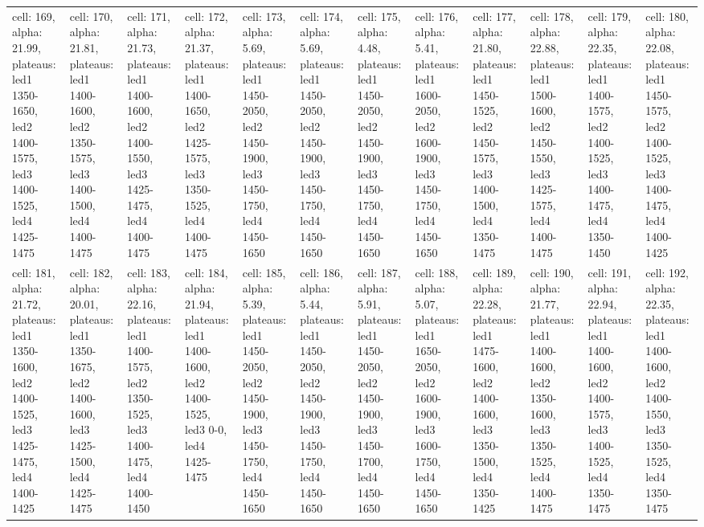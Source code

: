 \documentclass{article}
\begin{document}
\begin{landscape}
\begin{longtable}{|p{1.5cm}|p{1.5cm}|p{1.5cm}|p{1.5cm}|p{1.5cm}|p{1.5cm}|p{1.5cm}|p{1.5cm}|p{1.5cm}|p{1.5cm}|p{1.5cm}|p{1.5cm}|}
\rowcolor{lightgray} cell: 169, alpha: 21.99, plateaus: led1 1350-1650, led2 1400-1575, led3 1400-1525, led4 1425-1475 &cell: 170, alpha: 21.81, plateaus: led1 1400-1600, led2 1350-1575, led3 1400-1500, led4 1400-1475 &cell: 171, alpha: 21.73, plateaus: led1 1400-1600, led2 1400-1550, led3 1425-1475, led4 1400-1475 &cell: 172, alpha: 21.37, plateaus: led1 1400-1650, led2 1425-1575, led3 1350-1525, led4 1400-1475 &cell: 173, alpha: 5.69, plateaus: led1 1450-2050, led2 1450-1900, led3 1450-1750, led4 1450-1650 &cell: 174, alpha: 5.69, plateaus: led1 1450-2050, led2 1450-1900, led3 1450-1750, led4 1450-1650 &cell: 175, alpha: 4.48, plateaus: led1 1450-2050, led2 1450-1900, led3 1450-1750, led4 1450-1650 &cell: 176, alpha: 5.41, plateaus: led1 1600-2050, led2 1600-1900, led3 1450-1750, led4 1450-1650 &cell: 177, alpha: 21.80, plateaus: led1 1450-1525, led2 1450-1575, led3 1400-1500, led4 1350-1475 &cell: 178, alpha: 22.88, plateaus: led1 1500-1600, led2 1450-1550, led3 1425-1575, led4 1400-1475 &cell: 179, alpha: 22.35, plateaus: led1 1400-1575, led2 1400-1525, led3 1400-1475, led4 1350-1450 &cell: 180, alpha: 22.08, plateaus: led1 1450-1575, led2 1400-1525, led3 1400-1475, led4 1400-1425 \\
cell: 181, alpha: 21.72, plateaus: led1 1350-1600, led2 1400-1525, led3 1425-1475, led4 1400-1425 &cell: 182, alpha: 20.01, plateaus: led1 1350-1675, led2 1400-1600, led3 1425-1500, led4 1425-1475 &cell: 183, alpha: 22.16, plateaus: led1 1400-1575, led2 1350-1525, led3 1400-1475, led4 1400-1450 &cell: 184, alpha: 21.94, plateaus: led1 1400-1600, led2 1400-1525, led3 0-0, led4 1425-1475 &cell: 185, alpha: 5.39, plateaus: led1 1450-2050, led2 1450-1900, led3 1450-1750, led4 1450-1650 &cell: 186, alpha: 5.44, plateaus: led1 1450-2050, led2 1450-1900, led3 1450-1750, led4 1450-1650 &cell: 187, alpha: 5.91, plateaus: led1 1450-2050, led2 1450-1900, led3 1450-1700, led4 1450-1650 &cell: 188, alpha: 5.07, plateaus: led1 1650-2050, led2 1600-1900, led3 1600-1750, led4 1450-1650 &cell: 189, alpha: 22.28, plateaus: led1 1475-1600, led2 1400-1600, led3 1350-1500, led4 1350-1425 &cell: 190, alpha: 21.77, plateaus: led1 1400-1600, led2 1350-1600, led3 1350-1525, led4 1400-1475 &cell: 191, alpha: 22.94, plateaus: led1 1400-1600, led2 1400-1575, led3 1400-1525, led4 1350-1475 &cell: 192, alpha: 22.35, plateaus: led1 1400-1600, led2 1400-1550, led3 1350-1525, led4 1350-1475 \\

\end{longtable}
\end{landscape}
\end{document}
